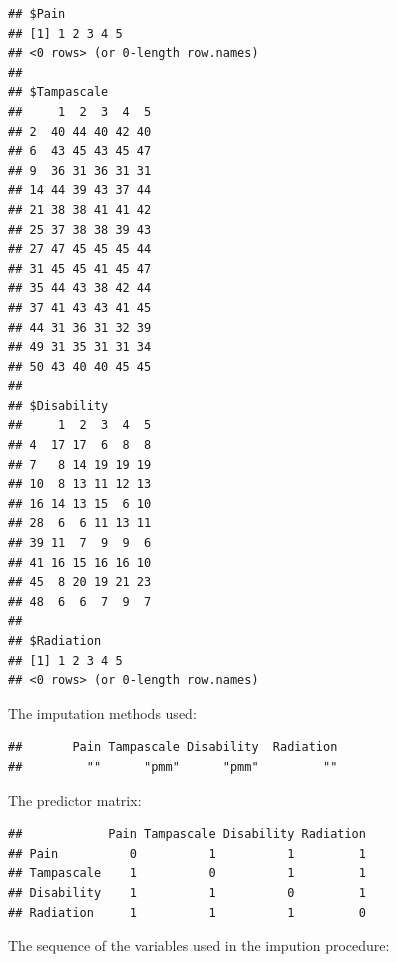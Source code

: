 \documentclass[]{book}
\newenvironment{Shaded}{\begin{snugshade}}{\end{snugshade}}
\newcommand{\OperatorTok}[1]{\textcolor[rgb]{0.81,0.36,0.00}{\textbf{#1}}}
\newcommand{\NormalTok}[1]{#1}
\begin{document}
\begin{verbatim}
## $Pain
## [1] 1 2 3 4 5
## <0 rows> (or 0-length row.names)
## 
## $Tampascale
##     1  2  3  4  5
## 2  40 44 40 42 40
## 6  43 45 43 45 47
## 9  36 31 36 31 31
## 14 44 39 43 37 44
## 21 38 38 41 41 42
## 25 37 38 38 39 43
## 27 47 45 45 45 44
## 31 45 45 41 45 47
## 35 44 43 38 42 44
## 37 41 43 43 41 45
## 44 31 36 31 32 39
## 49 31 35 31 31 34
## 50 43 40 40 45 45
## 
## $Disability
##     1  2  3  4  5
## 4  17 17  6  8  8
## 7   8 14 19 19 19
## 10  8 13 11 12 13
## 16 14 13 15  6 10
## 28  6  6 11 13 11
## 39 11  7  9  9  6
## 41 16 15 16 16 10
## 45  8 20 19 21 23
## 48  6  6  7  9  7
## 
## $Radiation
## [1] 1 2 3 4 5
## <0 rows> (or 0-length row.names)
\end{verbatim}

The imputation methods used:

\begin{Shaded}
\end{Shaded}

\begin{verbatim}
##       Pain Tampascale Disability  Radiation 
##         ""      "pmm"      "pmm"         ""
\end{verbatim}

The predictor matrix:

\begin{Shaded}
\end{Shaded}

\begin{verbatim}
##            Pain Tampascale Disability Radiation
## Pain          0          1          1         1
## Tampascale    1          0          1         1
## Disability    1          1          0         1
## Radiation     1          1          1         0
\end{verbatim}

The sequence of the variables used in the impution procedure:

\begin{Shaded}
\end{Shaded}
\end{document}
